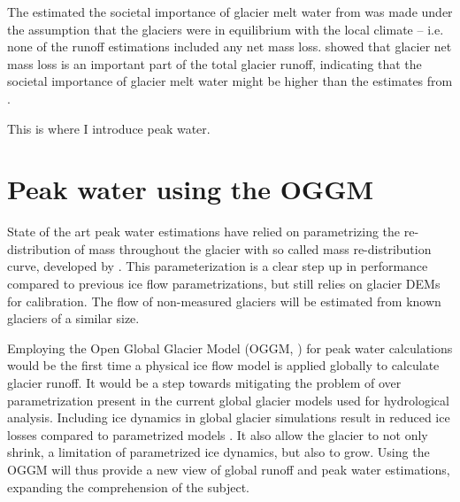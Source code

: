 \documentclass[12pt, a4paper]{article}
\begin{document}


The estimated the societal importance of glacier melt water from
\textcite{kaserContributionPotentialGlaciers2010} was made under the assumption
that the glaciers were in equilibrium with the local climate -- i.e. none of the
runoff estimations included any net mass loss.
\textcite{blissGlobalResponseGlacier2014} showed that glacier net mass loss is
an important part of the total glacier runoff, indicating that the societal
importance of glacier melt water might be higher than the estimates from
\textcite{kaserContributionPotentialGlaciers2010}.

This is where I introduce peak water.

\section{Peak water using the OGGM}
State of the art peak water estimations
\parencite{rounceGlacierMassChange2020,hussGlobalscaleHydrologicalResponse2018}
have relied on parametrizing the re-distribution of mass throughout the glacier
with so called mass re-distribution curve, developed by
\textcite{hussFutureHighmountainHydrology2010}. This parameterization is a clear
step up in performance compared to previous ice flow parametrizations, but still
relies on glacier DEMs for calibration. The flow of non-measured glaciers will
be estimated from known glaciers of a similar size. 

Employing the Open Global Glacier Model (OGGM,
\cite{maussionOpenGlobalGlacier2019}) for peak water calculations would be the
first time a physical ice flow model is applied globally to calculate glacier
runoff. It would be a step towards mitigating the problem of over
parametrization present in the current global glacier models used for
hydrological analysis. Including ice dynamics in global glacier simulations
result in reduced ice losses compared to parametrized models
\parencite{zekollariModellingFutureEvolution2019}. It also allow the glacier to
not only shrink, a limitation of parametrized ice dynamics, but also to grow. Using the OGGM will thus provide a new view of global runoff and peak water
estimations, expanding the comprehension of the subject.
\end{document}
